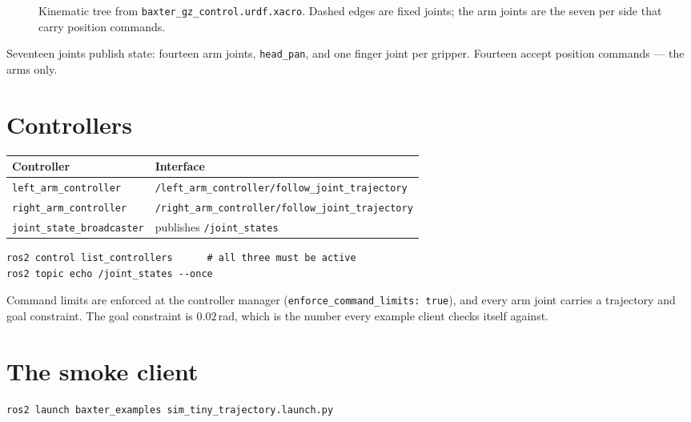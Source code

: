 \begin{figure}[h]
\centering
{}
\caption{Kinematic tree from \texttt{baxter\_gz\_control.urdf.xacro}. Dashed
edges are fixed joints; the arm joints are the seven per side that carry position
commands.}
\label{fig:tftree}
\end{figure}

Seventeen joints publish state: fourteen arm joints, \texttt{head\_pan}, and one
finger joint per gripper. Fourteen accept position commands --- the arms only.

\section{Controllers}

\begin{table}[h]
\centering
\small
\begin{tabularx}{\linewidth}{@{}lX@{}}
\toprule
\textbf{Controller} & \textbf{Interface} \\
\midrule
\texttt{left\_arm\_controller} & \texttt{/left\_arm\_controller/follow\_joint\_trajectory} \\
\texttt{right\_arm\_controller} & \texttt{/right\_arm\_controller/follow\_joint\_trajectory} \\
\texttt{joint\_state\_broadcaster} & publishes \texttt{/joint\_states} \\
\bottomrule
\end{tabularx}
\end{table}

\begin{lstlisting}
ros2 control list_controllers      # all three must be active
ros2 topic echo /joint_states --once
\end{lstlisting}

Command limits are enforced at the controller manager
(\texttt{enforce\_command\_limits: true}), and every arm joint carries a
trajectory and goal constraint. The goal constraint is $0.02$\,rad, which is the
number every example client checks itself against.

\section{The smoke client}

\begin{lstlisting}
ros2 launch baxter_examples sim_tiny_trajectory.launch.py
\end{lstlisting}

